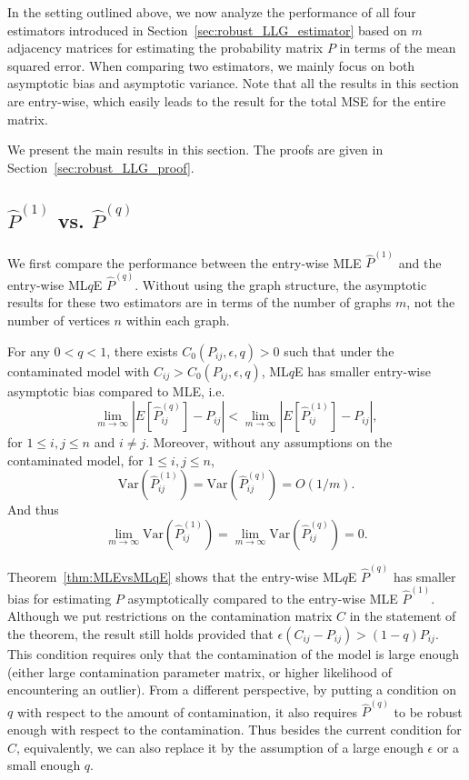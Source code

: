 In the setting outlined above, we now analyze the performance of all four estimators introduced in Section~\ref{sec:robust_LLG_estimator} based on $m$ adjacency matrices for estimating the probability matrix $P$ in terms of the mean squared error. When comparing two estimators, we mainly focus on both asymptotic bias and asymptotic variance. Note that all the results in this section are entry-wise, which easily leads to the result for the total MSE for the entire matrix.

We present the main results in this section. The proofs are given in Section~\ref{sec:robust_LLG_proof}.


\subsection[MLE vs. MLqE]{$\hat{P}^{(1)}$ vs. $\hat{P}^{(q)}$}
\label{section:MLEvsMLqE}
We first compare the performance between the entry-wise MLE $\hat{P}^{(1)}$ and the entry-wise ML$q$E $\hat{P}^{(q)}$. Without using the graph structure, the asymptotic results for these two estimators are in terms of the number of graphs $m$, not the number of vertices $n$ within each graph.


\begin{theorem}
\label{thm:MLEvsMLqE}
For any $0 < q < 1$, there exists $C_0(P_{ij}, \epsilon, q) > 0$ such that under the contaminated model with $C_{ij} > C_0(P_{ij}, \epsilon, q)$, ML$q$E has smaller entry-wise asymptotic bias compared to MLE, i.e.\
\[
	\lim_{m \to \infty} \left| E[\hat{P}^{(q)}_{ij}] - P_{ij} \right| < 
    \lim_{m \to \infty} \left| E[\hat{P}^{(1)}_{ij}] - P_{ij} \right|,
\]
for $1 \le i, j \le n$ and $i \ne j$.
Moreover, without any assumptions on the contaminated model, for $1 \le i, j \le n$, 
\[
	\mathrm{Var}(\hat{P}^{(1)}_{ij})
    = \mathrm{Var}(\hat{P}^{(q)}_{ij}) = O(1/m).
\]
And thus
\[
	\lim_{m \to \infty} \mathrm{Var}(\hat{P}^{(1)}_{ij})
    = \lim_{m \to \infty} \mathrm{Var}(\hat{P}^{(q)}_{ij}) = 0.
\]
\end{theorem}

Theorem~\ref{thm:MLEvsMLqE} shows that the entry-wise ML$q$E $\hat{P}^{(q)}$ has smaller bias for estimating $P$ asymptotically compared to the entry-wise MLE $\hat{P}^{(1)}$. Although we put restrictions on the contamination matrix $C$ in the statement of the theorem, the result still holds provided that $\epsilon (C_{ij} - P_{ij}) > (1 - q) P_{ij}$. This condition requires only that the contamination of the model is large enough (either large contamination parameter matrix, or higher likelihood of encountering an outlier). From a different perspective, by putting a condition on $q$ with respect to the amount of contamination, it also requires $\hat{P}^{(q)}$ to be robust enough with respect to the contamination. Thus besides the current condition for $C$, equivalently, we can also replace it by the assumption of a large enough $\epsilon$ or a small enough $q$.

